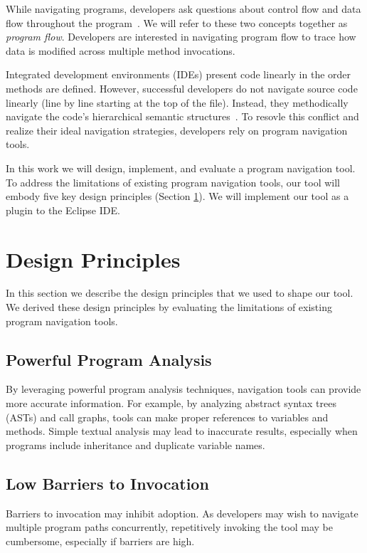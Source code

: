 \documentclass[conference]{IEEEtran}
\begin{document}
While navigating programs, developers ask questions about control flow and data flow throughout the program~\cite{latoza2010hard, Smith2015}. We will refer to these two concepts together as \textit{program flow}. Developers are interested in navigating program flow to trace how data is modified across multiple method invocations.

Integrated development environments (IDEs) present code linearly in the order methods are defined. However, successful developers do not navigate source code linearly (line by line starting at the top of the file). Instead, they methodically navigate the code's hierarchical semantic structures~\cite{robillard2004investigate}. To resovle this conflict and realize their ideal navigation strategies, developers rely on program navigation tools. 


In this work we will design, implement, and evaluate a program navigation tool.
To address the limitations of existing program navigation tools, our tool will embody five key design principles (Section \ref{DesignPrinciples}). We will implement our tool as a plugin to the Eclipse IDE. 

\section{Design Principles}
\label{DesignPrinciples}
In this section we describe the design principles that we used to shape our tool. We derived these design principles by evaluating the limitations of existing program navigation tools.
 
\subsection{Powerful Program Analysis}
By leveraging powerful program analysis techniques, navigation tools can provide more accurate information.
For example, by analyzing abstract syntax trees (ASTs) and call graphs, tools can make proper references to variables and methods. 
Simple textual analysis may lead to inaccurate results, especially when programs include inheritance and duplicate variable names.

\subsection{Low Barriers to Invocation}
Barriers to invocation may inhibit adoption. 
As developers may wish to navigate multiple program paths concurrently, repetitively invoking the tool may be cumbersome, especially if barriers are high. 
\end{document}
